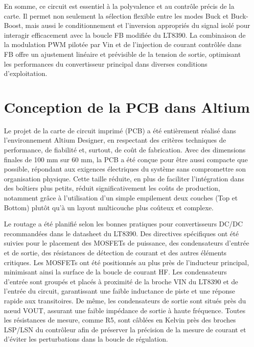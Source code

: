 En somme, ce circuit est essentiel à la polyvalence et au contrôle précis de la carte. Il permet non seulement la sélection flexible entre les modes Buck et Buck-Boost, mais aussi le conditionnement et l'inversion appropriés du signal isolé pour interagir efficacement avec la boucle FB modifiée du LT8390. La combinaison de la modulation PWM pilotée par Vin et de l'injection de courant contrôlée dans FB offre un ajustement linéaire et prévisible de la tension de sortie, optimisant les performances du convertisseur principal dans diverses conditions d'exploitation.





\section{Conception de la PCB dans Altium}

Le projet de la carte de circuit imprimé (PCB) a été entièrement réalisé dans l'environnement Altium Designer, en respectant des critères techniques de performance, de fiabilité et, surtout, de coût de fabrication. Avec des dimensions finales de 100 mm sur 60 mm, la PCB a été conçue pour être aussi compacte que possible, répondant aux exigences électriques du système sans compromettre son organisation physique. Cette taille réduite, en plus de faciliter l'intégration dans des boîtiers plus petits, réduit significativement les coûts de production, notamment grâce à l'utilisation d'un simple empilement deux couches (Top et Bottom) plutôt qu'à un layout multicouche plus coûteux et complexe.

Le routage a été planifié selon les bonnes pratiques pour convertisseurs DC/DC recommandées dans le datasheet du LT8390. Des directives spécifiques ont été suivies pour le placement des MOSFETs de puissance, des condensateurs d'entrée et de sortie, des résistances de détection de courant et des autres éléments critiques. Les MOSFETs ont été positionnés au plus près de l'inducteur principal, minimisant ainsi la surface de la boucle de courant HF. Les condensateurs d'entrée sont groupés et placés à proximité de la broche VIN du LT8390 et de l'entrée du circuit, garantissant une faible inductance de piste et une réponse rapide aux transitoires. De même, les condensateurs de sortie sont situés près du nœud VOUT, assurant une faible impédance de sortie à haute fréquence. Toutes les résistances de mesure, comme R5, sont câblées en Kelvin près des broches LSP/LSN du contrôleur afin de préserver la précision de la mesure de courant et d'éviter les perturbations dans la boucle de régulation.

